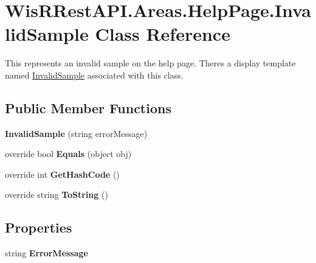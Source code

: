 \hypertarget{class_wis_r_rest_a_p_i_1_1_areas_1_1_help_page_1_1_invalid_sample}{}\section{Wis\+R\+Rest\+A\+P\+I.\+Areas.\+Help\+Page.\+Invalid\+Sample Class Reference}
\label{class_wis_r_rest_a_p_i_1_1_areas_1_1_help_page_1_1_invalid_sample}


This represents an invalid sample on the help page. There\textquotesingle{}s a display template named \hyperlink{class_wis_r_rest_a_p_i_1_1_areas_1_1_help_page_1_1_invalid_sample}{Invalid\+Sample} associated with this class.  


\subsection*{Public Member Functions}
\begin{DoxyCompactItemize}
\item 
\hypertarget{class_wis_r_rest_a_p_i_1_1_areas_1_1_help_page_1_1_invalid_sample_a5f91d2e1a13ee082685945cbaf19052e}{}{\bfseries Invalid\+Sample} (string error\+Message)\label{class_wis_r_rest_a_p_i_1_1_areas_1_1_help_page_1_1_invalid_sample_a5f91d2e1a13ee082685945cbaf19052e}

\item 
\hypertarget{class_wis_r_rest_a_p_i_1_1_areas_1_1_help_page_1_1_invalid_sample_af01a7e191de5b298610f09a2f0665ecb}{}override bool {\bfseries Equals} (object obj)\label{class_wis_r_rest_a_p_i_1_1_areas_1_1_help_page_1_1_invalid_sample_af01a7e191de5b298610f09a2f0665ecb}

\item 
\hypertarget{class_wis_r_rest_a_p_i_1_1_areas_1_1_help_page_1_1_invalid_sample_a9dd3e1bcd24fd01686364490921dbcca}{}override int {\bfseries Get\+Hash\+Code} ()\label{class_wis_r_rest_a_p_i_1_1_areas_1_1_help_page_1_1_invalid_sample_a9dd3e1bcd24fd01686364490921dbcca}

\item 
\hypertarget{class_wis_r_rest_a_p_i_1_1_areas_1_1_help_page_1_1_invalid_sample_a27fe2b70e35de86acd72cc23e143ab3c}{}override string {\bfseries To\+String} ()\label{class_wis_r_rest_a_p_i_1_1_areas_1_1_help_page_1_1_invalid_sample_a27fe2b70e35de86acd72cc23e143ab3c}

\end{DoxyCompactItemize}
\subsection*{Properties}
\begin{DoxyCompactItemize}
\item 
\hypertarget{class_wis_r_rest_a_p_i_1_1_areas_1_1_help_page_1_1_invalid_sample_ab94df20f15f80905622de0924886e4eb}{}string {\bfseries Error\+Message}\label{class_wis_r_rest_a_p_i_1_1_areas_1_1_help_page_1_1_invalid_sample_ab94df20f15f80905622de0924886e4eb}

\end{DoxyCompactItemize}


